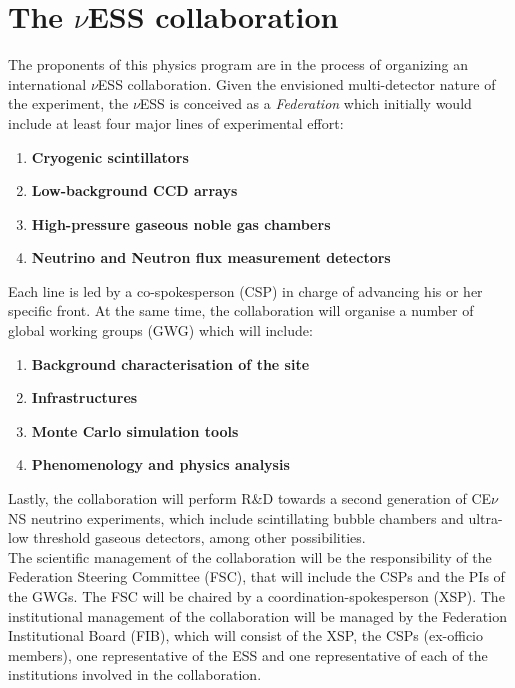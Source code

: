 \section{The $\nu$ESS collaboration}
The proponents of this physics program are in the process of organizing an international $\nu$ESS collaboration. Given the envisioned multi-detector nature of the experiment, the $\nu$ESS is conceived as a {\em Federation} which initially would include at least four major lines of experimental effort:
\begin{enumerate}
    \item {\bf Cryogenic scintillators}
     \item {\bf Low-background CCD arrays}
      \item {\bf High-pressure gaseous noble gas chambers}
     \item {\bf Neutrino and Neutron flux measurement detectors}
\end{enumerate}

Each line is led by a co-spokesperson (CSP) in charge of advancing his or her specific front. At the same time, the collaboration will organise a number of global working groups (GWG) which will include:

\begin{enumerate}
    \item {\bf Background characterisation of the site}
     \item {\bf Infrastructures}
      \item {\bf Monte Carlo simulation tools}
     \item {\bf Phenomenology and physics analysis}
\end{enumerate}

Lastly, the collaboration will perform R\&D towards a second generation of CE$\nu$NS neutrino experiments, which include scintillating  bubble  chambers and ultra-low threshold gaseous detectors, among other possibilities. \\

The scientific management of the collaboration will be the responsibility of the Federation Steering Committee (FSC), that will include the CSPs and the PIs of the GWGs. The FSC will be chaired by a coordination-spokesperson (XSP). The institutional management of the collaboration will be managed by the Federation Institutional Board (FIB), which will consist of the XSP, the CSPs (ex-officio members), one representative of the ESS and one representative of each of the institutions involved in the collaboration.\\

